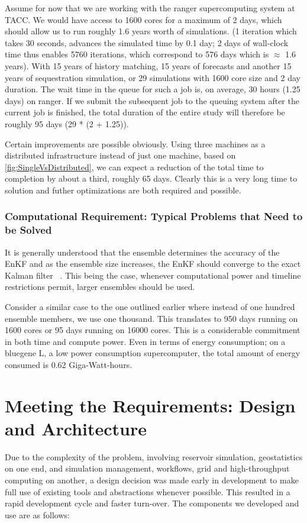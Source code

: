 \documentclass{rspublic}
\begin{document}
Assume for now that we are working with the ranger supercomputing
system at TACC. We would have access to 1600 cores for a maximum of 2
days, which should allow us to run roughly 1.6 years worth of
simulations. (1 iteration which takes 30 seconds, advances the
simulated time by 0.1 day; 2 days of wall-clock time thus enables 5760
iterations, which correspond to 576 days which is $\approx$ 1.6
years). With 15 years of history matching, 15 years of forecasts and
another 15 years of sequestration simulation, or 29 simulations with
1600 core size and 2 day duration. The wait time in the queue for such
a job is, on average, 30 hours (1.25 days) on ranger. If we submit the
subsequent job to the queuing system after the current job is
finished, the total duration of the entire study will therefore be
roughly 95 days (29 * (2 + 1.25)).

Certain improvements are possible obviously. Using three machines as a
distributed infrastructure instead of just one machine, based on
\ref{fig:SingleVsDistributed}, we can expect a reduction of the total
time to completion by about a third, roughly 65 days. Clearly this is
a very long time to solution and futher optimizations are both
required and possible.

\subsubsection{Computational Requirement: Typical Problems that Need to be Solved}
It is generally understood that the ensemble determines the accuracy
of the EnKF and as the ensemble size increases, the EnKF should
converge to the exact Kalman filter ~\cite{JiaLi}. This being the
case, whenever computational power and timeline restrictions permit,
larger ensembles should be used.

Consider a similar case to the one outlined earlier where instead of
one hundred ensemble members, we use one thousand. This translates to
950 days running on 1600 cores or 95 days running on 16000 cores.
This is a considerable commitment in both time and compute power. Even
in terms of energy consumption; on a bluegene L, a low power
consumption supercomputer, the total amount of energy consumed is 0.62
Giga-Watt-hours.

\section{Meeting the Requirements: Design and Architecture}

Due to the complexity of the problem, involving reservoir simulation,
geostatistics on one end, and simulation management, workflows, grid
and high-throughput computing on another, a design decision was made
early in development to make full use of existing tools and
abstractions whenever possible. This resulted in a rapid development
cycle and faster turn-over. The components we developed and use are as
follows:
\end{document}
